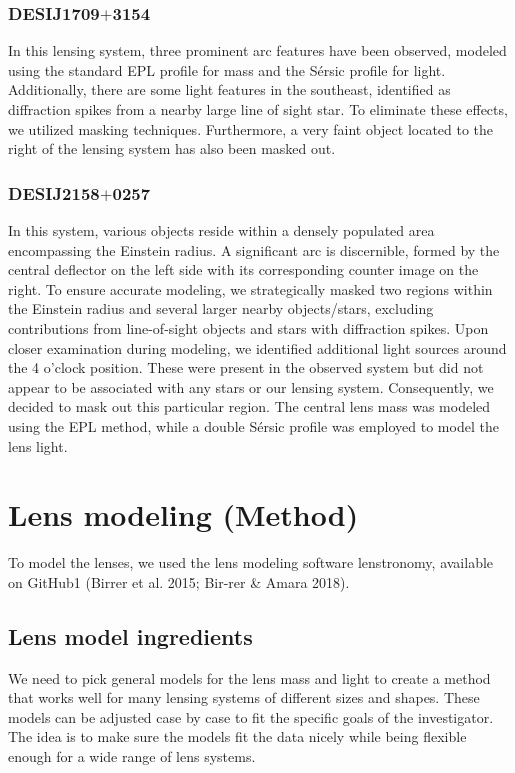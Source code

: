 \documentclass{aa}
\begin{document}
\subsubsection{DESIJ1709$+$3154}

In this lensing system, three prominent arc features have been observed, modeled using the standard EPL profile for mass and the S\'ersic  profile for light. Additionally, there are some light features in the southeast, identified as diffraction spikes from a nearby large line of sight star. To eliminate these effects, we utilized masking techniques. Furthermore, a very faint object located to the right of the lensing system has also been masked out.

\subsubsection{DESIJ2158$+$0257}

In this system, various objects reside within a densely populated area encompassing the Einstein radius. A significant arc is discernible, formed by the central deflector on the left side with its corresponding counter image on the right. To ensure accurate modeling, we strategically masked two regions within the Einstein radius and several larger nearby objects/stars, excluding contributions from line-of-sight objects and stars with diffraction spikes. Upon closer examination during modeling, we identified additional light sources around the 4 o'clock position. These were present in the observed system but did not appear to be associated with any stars or our lensing system. Consequently, we decided to mask out this particular region. The central lens mass was modeled using the EPL method, while a double S\'ersic profile was employed to model the lens light.


\section{Lens modeling (Method)} \label{sec:modeling_method}

To model the lenses, we used the lens modeling software lenstronomy, available on GitHub1 (Birrer et al. 2015; Bir-rer \& Amara 2018).

\subsection{Lens model ingredients}
We need to pick general models for the lens mass and light to create a method that works well for many lensing systems of different sizes and shapes. These models can be adjusted case by case to fit the specific goals of the investigator. The idea is to make sure the models fit the data nicely while being flexible enough for a wide range of lens systems.
\end{document}
